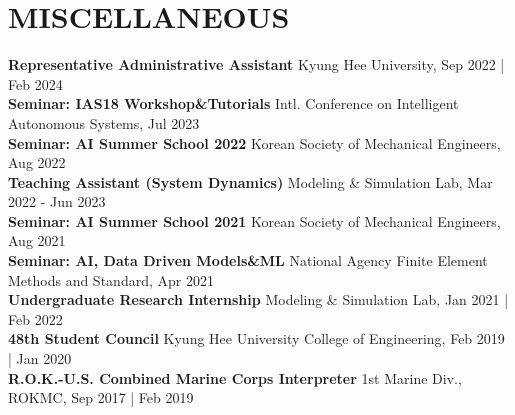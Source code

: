 \documentclass[a4paper,10pt]{extarticle}
\begin{document}
\section*{MISCELLANEOUS}
\textbf{Representative Administrative Assistant} \hfill Kyung Hee University, Sep 2022 | Feb 2024\\
\textbf{Seminar: IAS18 Workshop\&Tutorials} \hfill {\small Intl. Conference on Intelligent Autonomous Systems}, Jul 2023\\
\textbf{Seminar: AI Summer School 2022} \hfill Korean Society of Mechanical Engineers, Aug 2022\\
\textbf{Teaching Assistant (System Dynamics)} \hfill Modeling \& Simulation Lab, Mar 2022 - Jun 2023\\
\textbf{Seminar: AI Summer School 2021} \hfill Korean Society of Mechanical Engineers, Aug 2021\\
\textbf{Seminar: AI, Data Driven Models\&ML} \hfill {\small National Agency Finite Element Methods and Standard}, Apr 2021\\
\textbf{Undergraduate Research Internship} \hfill Modeling \& Simulation Lab, Jan 2021 | Feb 2022\\
\textbf{48th Student Council} \hfill Kyung Hee University College of Engineering, Feb 2019 | Jan 2020\\
\textbf{R.O.K.-U.S. Combined Marine Corps Interpreter} \hfill 1st Marine Div., ROKMC, Sep 2017 | Feb 2019\\
\end{document}

